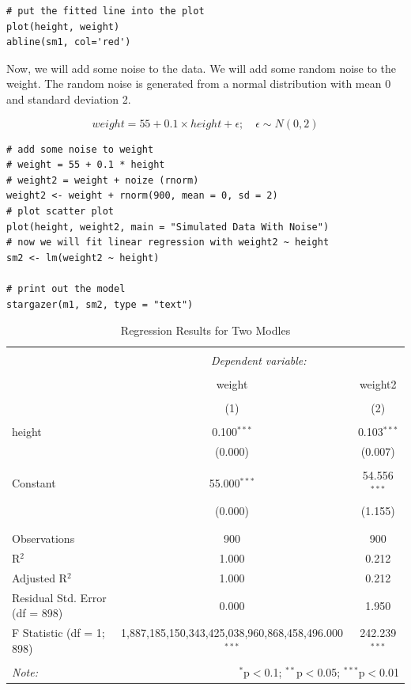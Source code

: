 \documentclass[11pt]{article}
\theoremstyle{definition}
\begin{document}
\begin{lstlisting}
# put the fitted line into the plot
plot(height, weight)
abline(sm1, col='red')
\end{lstlisting}

Now, we will add some noise to the data. We will add some random noise to the
weight. The random noise is generated from a normal distribution with mean 0
and standard deviation 2.

$$
weight = 55 + 0.1 \times height + \epsilon; \quad \epsilon \sim N(0, 2)
$$

\begin{lstlisting}
# add some noise to weight
# weight = 55 + 0.1 * height
# weight2 = weight + noize (rnorm)
weight2 <- weight + rnorm(900, mean = 0, sd = 2)
# plot scatter plot
plot(height, weight2, main = "Simulated Data With Noise")
# now we will fit linear regression with weight2 ~ height
sm2 <- lm(weight2 ~ height)

# print out the model
stargazer(m1, sm2, type = "text")
\end{lstlisting}

\begin{table}[!htbp] \centering 
  \caption{Regression Results for Two Modles} 
  \label{} 
\begin{tabular}{@{\extracolsep{5pt}}lcc} 
\\[-1.8ex]\hline 
\hline \\[-1.8ex] 
 & \multicolumn{2}{c}{\textit{Dependent variable:}} \\ 
\cline{2-3} 
\\[-1.8ex] & weight & weight2 \\ 
\\[-1.8ex] & (1) & (2)\\ 
\hline \\[-1.8ex] 
 height & 0.100$^{***}$ & 0.103$^{***}$ \\ 
  & (0.000) & (0.007) \\ 
  & & \\ 
 Constant & 55.000$^{***}$ & 54.556$^{***}$ \\ 
  & (0.000) & (1.155) \\ 
  & & \\ 
\hline \\[-1.8ex] 
Observations & 900 & 900 \\ 
R$^{2}$ & 1.000 & 0.212 \\ 
Adjusted R$^{2}$ & 1.000 & 0.212 \\ 
Residual Std. Error (df = 898) & 0.000 & 1.950 \\ 
F Statistic (df = 1; 898) & 1,887,185,150,343,425,038,960,868,458,496.000$^{***}$ & 242.239$^{***}$ \\ 
\hline 
\hline \\[-1.8ex] 
\textit{Note:}  & \multicolumn{2}{r}{$^{*}$p$<$0.1; $^{**}$p$<$0.05; $^{***}$p$<$0.01} \\ 
\end{tabular} 
\end{table} 
\end{document}
